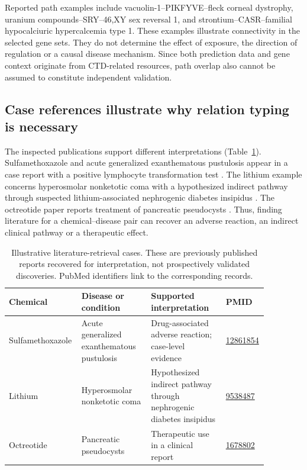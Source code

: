 Reported path examples include vacuolin-1--PIKFYVE--fleck corneal dystrophy, uranium compounds--SRY--46,XY sex reversal 1, and strontium--CASR--familial hypocalciuric hypercalcemia type 1. These examples illustrate connectivity in the selected gene sets. They do not determine the effect of exposure, the direction of regulation or a causal disease mechanism. Since both prediction data and gene context originate from CTD-related resources, path overlap also cannot be assumed to constitute independent validation.

\subsection{Case references illustrate why relation typing is necessary}
The inspected publications support different interpretations (Table~\ref{tab:cases}). Sulfamethoxazole and acute generalized exanthematous pustulosis appear in a case report with a positive lymphocyte transformation test \citep{anliker}. The lithium example concerns hyperosmolar nonketotic coma with a hypothesized indirect pathway through suspected lithium-associated nephrogenic diabetes insipidus \citep{azam}. The octreotide paper reports treatment of pancreatic pseudocysts \citep{gullo}. Thus, finding literature for a chemical--disease pair can recover an adverse reaction, an indirect clinical pathway or a therapeutic effect.

\begin{table}[htbp]
\centering\small
\caption{Illustrative literature-retrieval cases. These are previously published reports recovered for interpretation, not prospectively validated discoveries. PubMed identifiers link to the corresponding records.}
\label{tab:cases}
\begin{tabular}{p{0.20\linewidth}p{0.26\linewidth}p{0.28\linewidth}p{0.13\linewidth}}
\toprule
Chemical & Disease or condition & Supported interpretation & PMID \\
\midrule
Sulfamethoxazole & Acute generalized exanthematous pustulosis & Drug-associated adverse reaction; case-level evidence & \href{https://pubmed.ncbi.nlm.nih.gov/12861854/}{12861854} \\
Lithium & Hyperosmolar nonketotic coma & Hypothesized indirect pathway through nephrogenic diabetes insipidus & \href{https://pubmed.ncbi.nlm.nih.gov/9538487/}{9538487} \\
Octreotide & Pancreatic pseudocysts & Therapeutic use in a clinical report & \href{https://pubmed.ncbi.nlm.nih.gov/1678802/}{1678802} \\
\bottomrule
\end{tabular}
\end{table}

